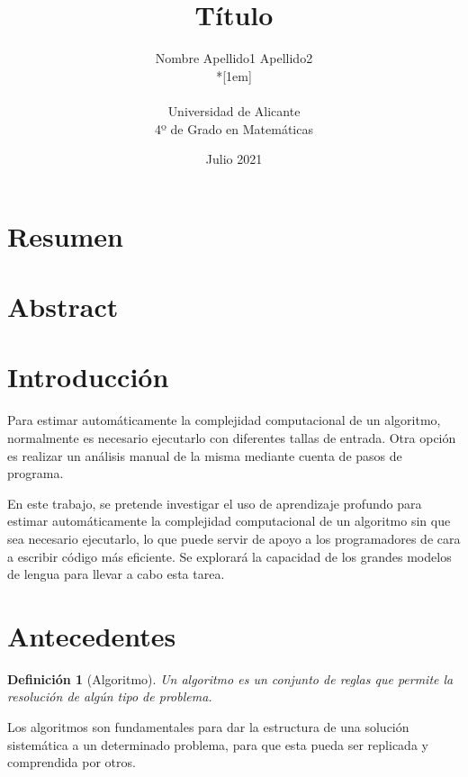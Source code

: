\documentclass[12pt,twoside]{article}
\title{Título}
\author{Nombre Apellido1 Apellido2\\*[1em]
\begin{minipage}{0.75\textwidth}
\footnotesize \itshape
\begin{center}
Universidad de Alicante \\
4º de Grado en Matemáticas
\end{center}
\end{minipage}
}
\date{Julio 2021}
\newtheorem{definition}[theorem]{Definición}
\begin{document}




\section*{Resumen}


\newpage

\section*{Abstract}


\newpage

\tableofcontents

\newpage

\section{Introducción}\label{sec:1}

Para estimar automáticamente la complejidad computacional \cite{antecedentes} de un algoritmo, normalmente es necesario ejecutarlo con diferentes tallas de entrada. Otra opción es realizar un análisis manual de la misma mediante cuenta de pasos de programa.

En este trabajo, se pretende investigar el uso de aprendizaje profundo para estimar automáticamente la complejidad computacional de un algoritmo sin que sea necesario ejecutarlo, lo que puede servir de apoyo a los programadores de cara a escribir código más eficiente. Se explorará la capacidad de los grandes modelos de lengua \cite{libro} para llevar a cabo esta tarea.

\section{Antecedentes}
\begin{definition}[Algoritmo]
    Un algoritmo es un conjunto de reglas que permite la resolución de algún tipo de problema.
\end{definition}

Los algoritmos son fundamentales para dar la estructura de una solución sistemática a un determinado problema, para que esta pueda ser replicada y comprendida por otros.
\end{document}
